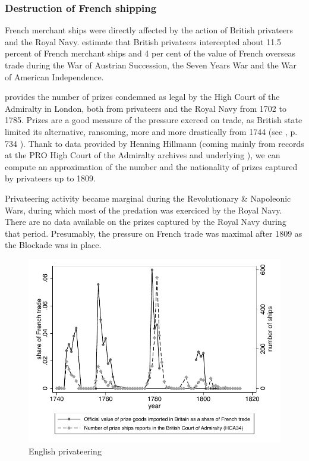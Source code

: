 \documentclass[12pt,a4paper,notitlepage,english]{article}
\begin{document}
\subsubsection{Destruction of French shipping}
French merchant ships were directly affected by the action of British privateers and the Royal Navy. 
\cite{Hillmann2011} estimate that British privateers intercepted about 11.5 percent of French merchant ships and 4 per cent of the value of French overseas trade during the War of Austrian Succession, the Seven Years War and the War of American Independence. 

\cite{Starkey1990} provides the number of prizes condemned as legal by the High Court of the Admiralty in London, both from privateers and the Royal Navy from 1702 to 1785. 
Prizes are a good measure of the pressure exerced on trade, as British state limited its alternative, ransoming, more and more drastically from 1744 (see \cite{Hillmann2011}, p. 734 ).
Thank to data provided by Henning Hillmann (coming mainly from records at the PRO High Court of the Admiralty archives and underlying \cite{Hillmann2011}), we can compute an approximation of the number and the nationality of prizes captured by privateers up to 1809.

Privateering activity became marginal during the Revolutionary \& Napoleonic Wars, during which most of the predation was exerciced by the Royal Navy.
There are no data available on the prizes captured by the Royal Navy during that period.
Presumably, the pressure on French trade was maximal after 1809 as the Blockade was in place.

\begin{center}
	\begin{figure}[H]
		\caption{English privateering}
		\label{GBannual_loss_function}
		\centering
		\includegraphics[scale=0.9]{Prizes.pdf}
	\end{figure}
\end{center}
\end{document}
